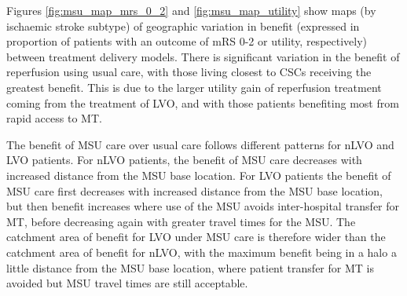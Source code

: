 Figures \ref{fig:msu_map_mrs_0_2} and \ref{fig:msu_map_utility} show maps (by ischaemic stroke subtype) of geographic variation in benefit (expressed in proportion of patients with an outcome of mRS 0-2 or utility, respectively) between treatment delivery models. There is significant variation in the benefit of reperfusion using usual care, with those living closest to CSCs receiving the greatest benefit. This is due to the larger utility gain of reperfusion treatment coming from the treatment of LVO, and with those patients benefiting most from rapid access to MT.

The benefit of MSU care over usual care follows different patterns for nLVO and LVO patients. For nLVO patients, the benefit of MSU care decreases with increased distance from the MSU base location. For LVO patients the benefit of MSU care first decreases with increased distance from the MSU base location, but then benefit increases where use of the MSU avoids inter-hospital transfer for MT, before decreasing again with greater travel times for the MSU. The catchment area of benefit for LVO under MSU care is therefore wider than the catchment area of benefit for nLVO, with the maximum benefit being in a halo a little distance from the MSU base location, where patient transfer for MT is avoided but MSU travel times are still acceptable.

